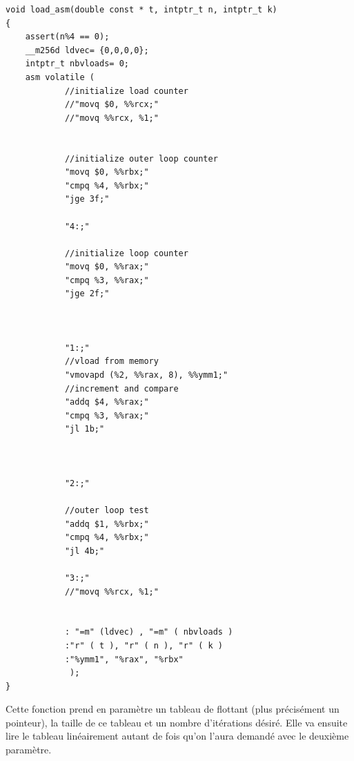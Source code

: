 \documentclass{report}
\begin{document}
\begin{lstlisting}
void load_asm(double const * t, intptr_t n, intptr_t k) 
{
	assert(n%4 == 0);
	__m256d ldvec= {0,0,0,0};
	intptr_t nbvloads= 0;
	asm volatile (
			//initialize load counter
			//"movq $0, %%rcx;"
			//"movq %%rcx, %1;"


			//initialize outer loop counter
			"movq $0, %%rbx;"
			"cmpq %4, %%rbx;"
			"jge 3f;"
			
			"4:;"

			//initialize loop counter
			"movq $0, %%rax;"
			"cmpq %3, %%rax;"
			"jge 2f;"



			"1:;"
			//vload from memory
			"vmovapd (%2, %%rax, 8), %%ymm1;"
			//increment and compare
			"addq $4, %%rax;"
			"cmpq %3, %%rax;"
			"jl 1b;"



			"2:;"

			//outer loop test
			"addq $1, %%rbx;"
			"cmpq %4, %%rbx;"
			"jl 4b;"

			"3:;"
			//"movq %%rcx, %1;"


			: "=m" (ldvec) , "=m" ( nbvloads )
			:"r" ( t ), "r" ( n ), "r" ( k )
			:"%ymm1", "%rax", "%rbx"
		     );
}

\end{lstlisting}
Cette fonction prend en paramètre un tableau de flottant (plus précisément un pointeur), la taille de 
ce tableau et un nombre d'itérations désiré. Elle va ensuite lire le tableau linéairement autant de fois
qu'on l'aura demandé avec le deuxième paramètre.
\end{document}
